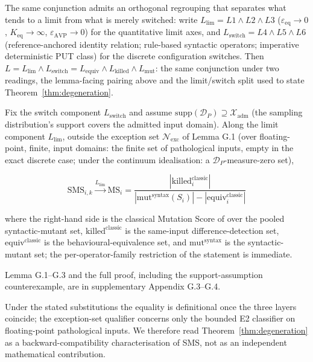 \documentclass[manuscript,screen,review]{acmart}
\begin{document}
The same conjunction admits an orthogonal regrouping that separates what
tends to a limit from what is merely switched: write
$L_{\mathrm{lim}} = L1 \wedge L2 \wedge L3$
($\varepsilon_{\mathrm{eq}} \to 0$, $K_{\mathrm{eq}} \to \infty$,
$\varepsilon_{\mathrm{AVP}} \to 0$) for the quantitative limit axes, and
$L_{\mathrm{switch}} = L4 \wedge L5 \wedge L6$ (reference-anchored
identity relation; rule-based syntactic operators; imperative
deterministic PUT class) for the discrete configuration switches. Then
$L = L_{\mathrm{lim}} \wedge L_{\mathrm{switch}} = L_{\mathrm{equiv}} \wedge L_{\mathrm{killed}} \wedge L_{\mathrm{mut}}$:
the same conjunction under two readings, the lemma-facing pairing above
and the limit/switch split used to state Theorem~\ref{thm:degeneration}.

\begin{theorem}\label{thm:degeneration}
Fix the switch component $L_{\mathrm{switch}}$ and assume
$\mathrm{supp}(\mathcal{D}_P) \supseteq \mathcal{X}_{\mathrm{adm}}$ (the
sampling distribution's support covers the admitted input domain). Along
the limit component $L_{\mathrm{lim}}$, outside the exception set
$\mathcal{N}_{\mathrm{exc}}$ of Lemma G.1 (over floating-point, finite,
input domains: the finite set of pathological inputs, empty in the exact
discrete case; under the continuum idealisation: a
$\mathcal{D}_P$-measure-zero set),

\[ \mathrm{SMS}_{i,k} \xrightarrow{L_{\mathrm{lim}}} \mathrm{MS}_{i} = \frac{|\mathrm{killed}_{i}^{\mathrm{classic}}|}{|\mathrm{mut}^{\mathrm{syntax}}(S_i)| - |\mathrm{equiv}_{i}^{\mathrm{classic}}|} \]

where the right-hand side is the classical Mutation Score of
\citet{d7c38286734419b52de4262c9802ebdfcf4b9447} over the pooled syntactic-mutant set,
$\mathrm{killed}^{\mathrm{classic}}$ is the same-input
difference-detection set,
$\mathrm{equiv}^{\mathrm{classic}}$ is the behavioural-equivalence set,
and $\mathrm{mut}^{\mathrm{syntax}}$ is the syntactic-mutant set; the
per-operator-family restriction of the statement is immediate.
\end{theorem}

Lemma G.1--G.3 and the full proof, including the support-assumption
counterexample, are in supplementary Appendix G.3--G.4.

Under the stated substitutions the equality is definitional once the
three layers coincide; the exception-set qualifier concerns only
the bounded E2 classifier on floating-point pathological inputs. We
therefore read Theorem~\ref{thm:degeneration} as a
backward-compatibility characterisation of SMS, not as an independent
mathematical contribution.
\end{document}
